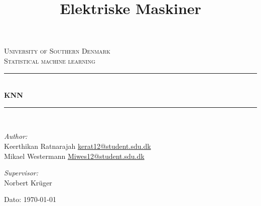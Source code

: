 \documentclass[11pt]{report}
\title{Elektriske Maskiner}
\begin{document}
\begin{titlepage}
\begin{center}


\textsc{\LARGE University of Southern Denmark}\\[1.5cm]
\textsc{\Large Statistical machine learning}\\[0.5cm]
\vfill
\hrule ~\\[0.3cm]
{ \huge \bfseries KNN\\[0.4cm] }
\hrule ~\\[1.5cm]
\vfill

\noindent
\begin{minipage}{0.4\textwidth}
\begin{flushleft} \large
\emph{Author:}\\
Keerthikan Ratnarajah
\url{kerat12@student.sdu.dk}\\
Mikael Westermann
\url{Miwes12@student.sdu.dk}
\end{flushleft}
\end{minipage}%
\begin{minipage}{0.4\textwidth}
\begin{flushright} \large
\emph{Supervisor:}\\
Norbert Kr\"{u}ger 
\end{flushright}
\end{minipage}

\vspace{1.2cm}
Dato: \today


\end{center}
\end{titlepage}

\tableofcontents

\newpage










\end{document}
